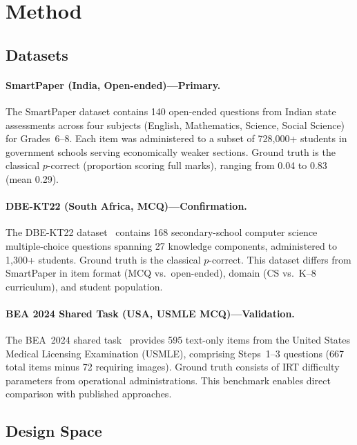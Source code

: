 \documentclass[runningheads]{llncs}
\begin{document}
\section{Method}

\subsection{Datasets}

\paragraph{SmartPaper (India, Open-ended)---Primary.}
The SmartPaper dataset contains 140 open-ended questions from Indian state assessments across four subjects (English, Mathematics, Science, Social Science) for Grades~6--8. Each item was administered to a subset of 728,000+ students in government schools serving economically weaker sections. Ground truth is the classical $p$-correct (proportion scoring full marks), ranging from 0.04 to 0.83 (mean 0.29).

\paragraph{DBE-KT22 (South Africa, MCQ)---Confirmation.}
The DBE-KT22 dataset~\cite{dbe-kt22-zenodo} contains 168 secondary-school computer science multiple-choice questions spanning 27 knowledge components, administered to 1,300+ students. Ground truth is the classical $p$-correct. This dataset differs from SmartPaper in item format (MCQ vs.\ open-ended), domain (CS vs.\ K--8 curriculum), and student population.

\paragraph{BEA 2024 Shared Task (USA, USMLE MCQ)---Validation.}
The BEA~2024 shared task~\cite{yaneva2024} provides 595 text-only items from the United States Medical Licensing Examination (USMLE), comprising Steps~1--3 questions (667 total items minus 72 requiring images). Ground truth consists of IRT difficulty parameters from operational administrations. This benchmark enables direct comparison with published approaches.

\subsection{Design Space}
\end{document}
